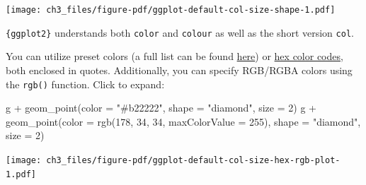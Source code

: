 \documentclass[
  letterpaper,
]{scrbook}
\newenvironment{Shaded}{\begin{snugshade}}{\end{snugshade}}
\newcommand{\AttributeTok}[1]{\textcolor[rgb]{0.40,0.45,0.13}{#1}}
\newcommand{\DecValTok}[1]{\textcolor[rgb]{0.68,0.00,0.00}{#1}}
\newcommand{\FunctionTok}[1]{\textcolor[rgb]{0.28,0.35,0.67}{#1}}
\newcommand{\NormalTok}[1]{\textcolor[rgb]{0.00,0.23,0.31}{#1}}
\newcommand{\SpecialCharTok}[1]{\textcolor[rgb]{0.37,0.37,0.37}{#1}}
\newcommand{\StringTok}[1]{\textcolor[rgb]{0.13,0.47,0.30}{#1}}
\begin{document}
\texttt{[image: ch3\_files/figure-pdf/ggplot-default-col-size-shape-1.pdf]}

\begin{tcolorbox}[enhanced jigsaw, rightrule=.15mm, arc=.35mm, title=\textcolor{quarto-callout-note-color}{\faInfo}\hspace{0.5em}{Color or Colour?}, colback=white, toptitle=1mm, colbacktitle=quarto-callout-note-color!10!white, breakable, left=2mm, opacityback=0, leftrule=.75mm, bottomrule=.15mm, bottomtitle=1mm, colframe=quarto-callout-note-color-frame, coltitle=black, toprule=.15mm, opacitybacktitle=0.6, titlerule=0mm]

\texttt{\{ggplot2\}} understands both \texttt{color} and \texttt{colour}
as well as the short version \texttt{col}.

\end{tcolorbox}

\begin{tcolorbox}[enhanced jigsaw, rightrule=.15mm, arc=.35mm, title=\textcolor{quarto-callout-tip-color}{\faLightbulb}\hspace{0.5em}{Color Presets 🎨}, colback=white, toptitle=1mm, colbacktitle=quarto-callout-tip-color!10!white, breakable, left=2mm, opacityback=0, leftrule=.75mm, bottomrule=.15mm, bottomtitle=1mm, colframe=quarto-callout-tip-color-frame, coltitle=black, toprule=.15mm, opacitybacktitle=0.6, titlerule=0mm]

You can utilize preset colors (a full list can be found
\href{http://www.stat.columbia.edu/~tzheng/files/Rcolor.pdf}{here}) or
\href{https://www.techopedia.com/definition/29788/color-hex-code}{hex
color codes}, both enclosed in quotes. Additionally, you can specify
RGB/RGBA colors using the \texttt{rgb()} function. Click to expand:

\begin{Shaded}
\begin{Highlighting}[]
\NormalTok{g }\SpecialCharTok{+} \FunctionTok{geom\_point}\NormalTok{(}\AttributeTok{color =} \StringTok{"\#b22222"}\NormalTok{, }\AttributeTok{shape =} \StringTok{"diamond"}\NormalTok{, }\AttributeTok{size =} \DecValTok{2}\NormalTok{)}
\NormalTok{g }\SpecialCharTok{+} \FunctionTok{geom\_point}\NormalTok{(}\AttributeTok{color =} \FunctionTok{rgb}\NormalTok{(}\DecValTok{178}\NormalTok{, }\DecValTok{34}\NormalTok{, }\DecValTok{34}\NormalTok{, }\AttributeTok{maxColorValue =} \DecValTok{255}\NormalTok{), }\AttributeTok{shape =} \StringTok{"diamond"}\NormalTok{, }\AttributeTok{size =} \DecValTok{2}\NormalTok{)}
\end{Highlighting}
\end{Shaded}

\texttt{[image: ch3\_files/figure-pdf/ggplot-default-col-size-hex-rgb-plot-1.pdf]}

\end{tcolorbox}
\end{document}
